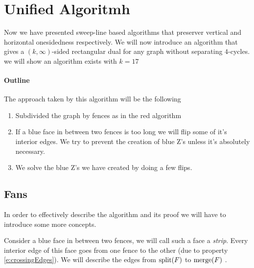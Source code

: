 
\newenvironment{invariants}{%
  \refstepcounter{thrm}%
  \paragraph{Invariants~\theprop}%
  \renewcommand*{\theenumi}{\theprop\,(I\arabic{enumi})}%
  \renewcommand*{\labelenumi}{(I\arabic{enumi})}%
  \enumerate
}{%
  \endenumerate
}

\section{Unified Algoritmh}

Now we have presented sweep-line based algorithms that preserver vertical and horizontal onesidedness respectively. We will now introduce an algorithm that gives a $(k,\infty)$-sided rectangular dual for any graph without separating $4$-cycles. we will show an algorithm exists with $k=17$

\paragraph{Outline}
The approach taken by this algorithm will be the following
\begin{enumerate}
  \item Subdivided the graph by fences as in the red algorithm
  \item If a blue face in between two fences is too long we will flip some of it's interior edges. We try to prevent the creation of blue Z's unless it's absolutely necessary.
  \item We solve the blue Z's we have created by doing a few flips.
\end{enumerate}


 \subsection{Fans}
 In order to effectively describe the algorithm and its proof we will have to introduce some more concepts.

 Consider a blue face in between two fences, we will call such a face a \emph{strip}. Every interior edge of this face goes from one fence to the other (due to property \ref{e:crossingEdges}). We will describe the edges from $\operatorname{split}(F)$ to $\operatorname{merge}(F)$ .

